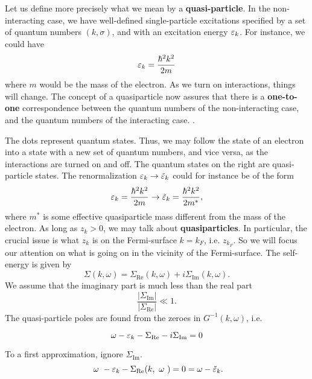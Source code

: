 Let us define more precisely what we mean by a \textbf{quasi-particle}. In the non-interacting case, we have well-defined single-particle excitations specified by a set of quantum numbers $(k, \sigma)$, and with an excitation energy $ \varepsilon_k $. For instance, we could have 
\begin{equation} 
\varepsilon_k = \frac{\hbar^2k^2}{2m}
\end{equation}
where $m$ would be the mass of the electron. As we turn on interactions, things will change. The concept of a quasiparticle now assures that there is a \textbf{one-to-one} correspondence between the quantum numbers of the non-interacting case, and the quantum numbers of the interacting case. 
.

The dots represent quantum states. Thus, we may follow the state of an electron into a state with a new set of quantum numbers, and vice versa, as the interactions are turned on and off. The quantum states on the right are quasi-particle states. The renormalization $\varepsilon_k  \rightarrow\tilde{\varepsilon}_k$ could for instance be of the form 
\begin{equation} 
\varepsilon_k = \frac{\hbar^2k^2}{2m} \rightarrow \tilde{\varepsilon}_k = \frac{\hbar^2k^2}{2m^*},
\end{equation}
where $m^*$ is some effective quasiparticle mass different from the mass of the electron. As long as $z_k > 0$, we may talk about \textbf{quasiparticles}. In particular, the crucial issue is what $z_k$ is on the Fermi-surface $k=k_F$, i.e. $z_{k_F}$. So we will focus our attention on what is going on in the vicinity of the Fermi-surface. 
The self-energy is given by
\begin{equation} 
\Sigma(k, \omega) = \Sigma_{\text{Re}}(k,\omega) + i\Sigma_{\text{Im}}(k, \omega).
\end{equation}
We assume that the imaginary part is much less than the real part
\begin{equation} 
\frac{|\Sigma_{\text{Im}}|}{|\Sigma_{\text{Re}}|} \ll 1.
\end{equation}
The quasi-particle poles are found from the zeroes in $G^{-1}(k,\omega)$, i.e.
\begin{tcolorbox}
	\begin{equation} 
		\omega-\varepsilon_k-\Sigma_{\text{Re}} -i\Sigma_{\text{Im}}  = 0	
	\end{equation}
\end{tcolorbox}
To a first approximation, ignore $\Sigma_{\text{Im}}$.
\begin{equation} 
\tikzmark{node1}{\omega}-\ep_k - \Sigma_{\text{Re}}(k,\tikzmark{node2}{\omega}) = 0 = \omega-\tilde{\ep}_k.
\end{equation}
